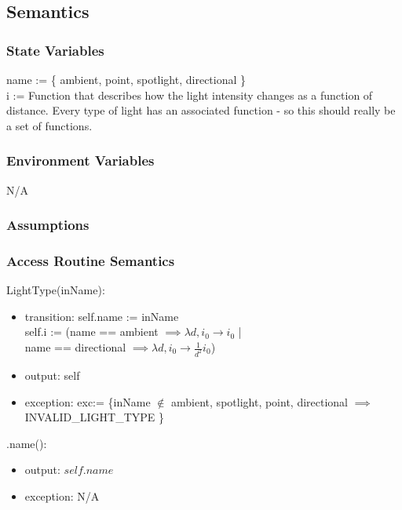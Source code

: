 \documentclass[12pt, titlepage]{article}
\begin{document}
\subsection{Semantics}
\subsubsection{State Variables}
name := \{ ambient, point, spotlight, directional \} \\
i := Function that describes how the light intensity changes as a function of 
distance. Every type of light has an associated function - so this should 
really be a set of functions.\\

\subsubsection{Environment Variables}
N/A

\subsubsection{Assumptions}

\subsubsection{Access Routine Semantics}
\noindent LightType(inName):
\begin{itemize}
	\item transition: self.name := inName \\
					  self.i := (name == ambient $\implies \lambda d, i_{0} \to 
					  i_{0}$ |\\
					  name == directional $\implies \lambda d, i_{0} \to 
					  \frac{1}{d^2}i_{0}$)
	\item output: self
	\item exception: exc:= \{inName $\notin$ {ambient, spotlight, point, 
	directional} $\implies$ INVALID\_LIGHT\_TYPE \}
\end{itemize}

\noindent .name():
\begin{itemize}
	\item output: $self.name$
	\item exception: N/A
\end{itemize}
\end{document}
